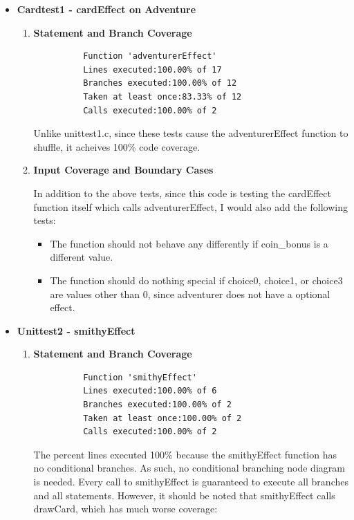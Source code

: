 \documentclass[11pt,letterpaper]{article}
\begin{document}
\begin{enumerate}[label=\Roman*.]
\begin{itemize}[leftmargin=*]
      \item \textbf{Cardtest1 - cardEffect on Adventure}
      
        \begin{enumerate}[leftmargin=*]
          \item \textbf{Statement and Branch Coverage}
          \begin{lstlisting}
          Function 'adventurerEffect'
          Lines executed:100.00% of 17
          Branches executed:100.00% of 12
          Taken at least once:83.33% of 12
          Calls executed:100.00% of 2
          \end{lstlisting}

          Unlike unittest1.c, since these tests cause the adventurerEffect function
            to shuffle, it acheives 100\% code coverage.

        \item \textbf{Input Coverage and Boundary Cases}
          
          In addition to the above tests, since this code is testing the cardEffect 
            function itself which calls adventurerEffect, I would also add the following
            tests:
          \begin{itemize}
            \item The function should not behave any differently if coin\_bonus is 
              a different value. 
            \item The function should do nothing special if choice0, choice1, or choice3 
              are values other than 0, since adventurer does not have a optional effect.
          \end{itemize}
        \end{enumerate}

      \item \textbf{Unittest2 - smithyEffect}
        \begin{enumerate}[leftmargin=*]
          \item \textbf{Statement and Branch Coverage}

          \begin{lstlisting}
          Function 'smithyEffect'
          Lines executed:100.00% of 6
          Branches executed:100.00% of 2
          Taken at least once:100.00% of 2
          Calls executed:100.00% of 2
          \end{lstlisting}

          The percent lines executed 100\% because the smithyEffect function
          has no conditional branches. As such, no conditional branching node
          diagram is needed. Every call to smithyEffect is guaranteed to 
          execute all branches and all statements. However, it should be
          noted that smithyEffect calls drawCard, which has much worse
          coverage: 


\end{enumerate}
\end{itemize}
\end{enumerate}
\end{document}
